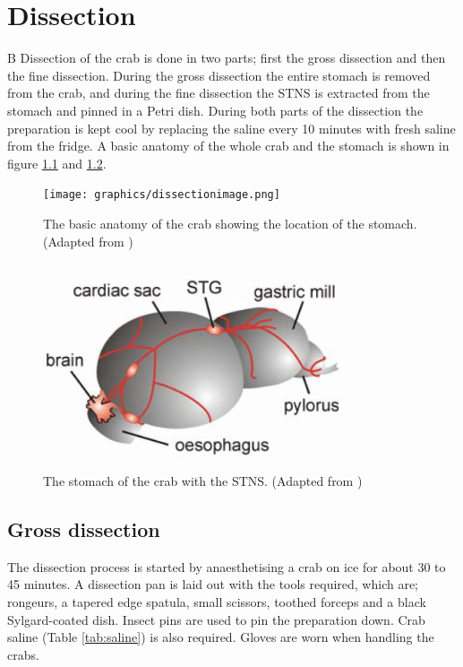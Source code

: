 \chapter{Dissection}{B}
\label{app:dissection}
Dissection of the crab is done in two parts; first the gross dissection and then the fine dissection. During the gross dissection the entire stomach is removed from the crab, and during the fine dissection the \ac{STNS} is extracted from the stomach and pinned in a Petri dish. During both parts of the dissection the preparation is kept cool by replacing the saline every 10 minutes with fresh saline from the fridge. A basic anatomy of the  whole crab and the stomach is shown in figure \ref{fig:dissectionimage} and \ref{fig:stomach}.

\begin{figure}[H]
	\begin{center}
		\texttt{[image: graphics/dissectionimage.png]}
		\caption{The basic anatomy of the crab showing the location of the stomach. (Adapted from \cite{Stein2009})}
		\label{fig:dissectionimage}
	\end{center}
\end{figure}

\begin{figure}[H]
	\begin{center}
		\includegraphics[width=9cm]{graphics/stomach.png}
		\caption{The stomach of the crab with the \ac{STNS}. (Adapted from \cite{Stein2009})}
		\label{fig:stomach}
	\end{center}
\end{figure}



\section{Gross dissection}
The dissection process is started by anaesthetising a crab on ice for about 30 to 45 minutes. A dissection pan is laid out with the tools required, which are; rongeurs, a tapered edge spatula, small scissors, toothed forceps and a black Sylgard-coated dish. Insect pins are used to pin the preparation down. Crab saline (Table \ref{tab:saline}) is also required. Gloves are worn when handling the crabs.

